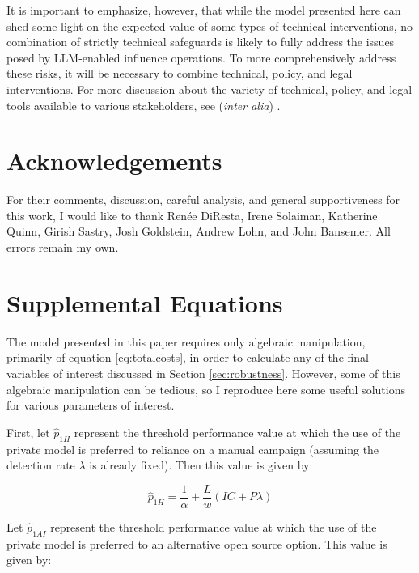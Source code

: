 \documentclass{article}
\begin{document}
It is important to emphasize, however, that while the model presented here can shed some light on the expected value of some types of technical interventions, no combination of strictly technical safeguards is likely to fully address the issues posed by LLM-enabled influence operations. To more comprehensively address these risks, it will be necessary to combine technical, policy, and legal interventions. For more discussion about the variety of technical, policy, and legal tools available to various stakeholders, see (\textit{inter alia}) \cite{workshop, sedova1, sedova2, shelvane, solaiman, releasestrats, deepmind}. 

\section*{Acknowledgements}

For their comments, discussion, careful analysis, and general supportiveness for this work, I would like to thank Renée DiResta, Irene Solaiman, Katherine Quinn, Girish Sastry, Josh Goldstein, Andrew Lohn, and John Bansemer. All errors remain my own. 


\newpage 

\appendix
\section{Supplemental Equations}
\label{sec:supplemental}

The model presented in this paper requires only algebraic manipulation, primarily of equation \ref{eq:totalcosts}, in order to calculate any of the final variables of interest discussed in Section \ref{sec:robustness}. However, some of this algebraic manipulation can be tedious, so I reproduce here some useful solutions for various parameters of interest. 

First, let $\hat{p}_{1H}$ represent the threshold performance value at which the use of the private model is preferred to reliance on a manual campaign (assuming the detection rate $\lambda$ is already fixed). Then this value is given by:

\begin{equation}
  \hat{p}_{1H} = \frac{1}{\alpha} + \frac{L}{w} \left( IC + P \lambda \right)
\end{equation}

Let $\hat{p}_{1AI}$ represent the threshold performance value at which the use of the private model is preferred to an alternative open source option. This value is given by:
\end{document}
